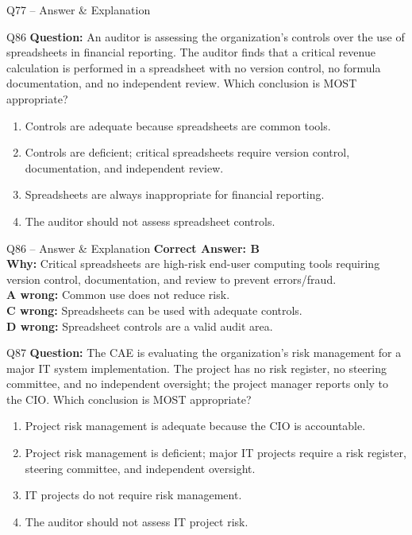 \documentclass[aspectratio=169,10pt]{beamer}
\begin{document}
\begin{frame}[t]{Q77 -- Answer \& Explanation}
	\begin{frame}[t]{Q86}
		\small
		\textbf{Question:} An auditor is assessing the organization's controls over the use of spreadsheets in financial reporting. The auditor finds that a critical revenue calculation is performed in a spreadsheet with no version control, no formula documentation, and no independent review. Which conclusion is MOST appropriate?
		\begin{enumerate}[label=\Alph*.,itemsep=1pt,topsep=2pt]
			\item Controls are adequate because spreadsheets are common tools.
			\item Controls are deficient; critical spreadsheets require version control, documentation, and independent review.
			\item Spreadsheets are always inappropriate for financial reporting.
			\item The auditor should not assess spreadsheet controls.
		\end{enumerate}
	\end{frame}
	
	\begin{frame}[t]{Q86 -- Answer \& Explanation}
		\small
		\textbf{Correct Answer: B} \\[4pt]
		\textbf{Why:} Critical spreadsheets are high-risk end-user computing tools requiring version control, documentation, and review to prevent errors/fraud. \\[4pt]
		\textbf{A wrong:} Common use does not reduce risk. \\[2pt]
		\textbf{C wrong:} Spreadsheets can be used with adequate controls. \\[2pt]
		\textbf{D wrong:} Spreadsheet controls are a valid audit area.
	\end{frame}
	
	\begin{frame}[t]{Q87}
		\small
		\textbf{Question:} The CAE is evaluating the organization's risk management for a major IT system implementation. The project has no risk register, no steering committee, and no independent oversight; the project manager reports only to the CIO. Which conclusion is MOST appropriate?
		\begin{enumerate}[label=\Alph*.,itemsep=1pt,topsep=2pt]
			\item Project risk management is adequate because the CIO is accountable.
			\item Project risk management is deficient; major IT projects require a risk register, steering committee, and independent oversight.
			\item IT projects do not require risk management.
			\item The auditor should not assess IT project risk.
		\end{enumerate}
	\end{frame}
	

\end{frame}
\end{document}
